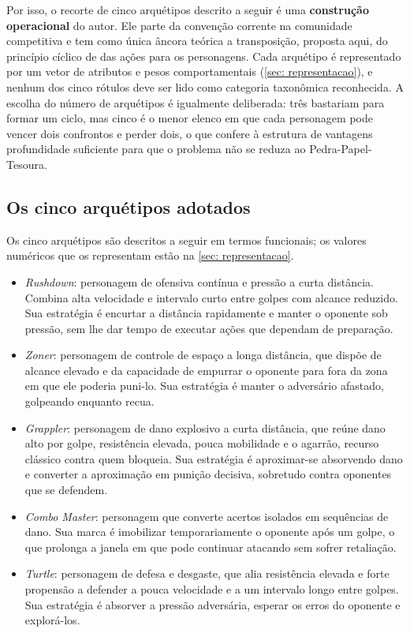 Por isso, o recorte de cinco arquétipos descrito a seguir é uma \textbf{construção operacional} do autor. Ele parte da convenção corrente na comunidade competitiva e tem como única âncora teórica a transposição, proposta aqui, do princípio cíclico de  das ações para os personagens. Cada arquétipo é representado por um vetor de atributos e pesos comportamentais (\autoref{sec: representacao}), e nenhum dos cinco rótulos deve ser lido como categoria taxonômica reconhecida. A escolha do número de arquétipos é igualmente deliberada: três bastariam para formar um ciclo, mas cinco é o menor elenco em que cada personagem pode vencer dois confrontos e perder dois, o que confere à estrutura de vantagens profundidade suficiente para que o problema não se reduza ao Pedra-Papel-Tesoura.

\subsection{Os cinco arquétipos adotados}

Os cinco arquétipos são descritos a seguir em termos funcionais; os valores numéricos que os representam estão na \autoref{sec: representacao}.

\begin{itemize}
    \item \textit{Rushdown}: personagem de ofensiva contínua e pressão a curta distância. Combina alta velocidade e intervalo curto entre golpes com alcance reduzido. Sua estratégia é encurtar a distância rapidamente e manter o oponente sob pressão, sem lhe dar tempo de executar ações que dependam de preparação.

    \item \textit{Zoner}: personagem de controle de espaço a longa distância, que dispõe de alcance elevado e da capacidade de empurrar o oponente para fora da zona em que ele poderia puni-lo. Sua estratégia é manter o adversário afastado, golpeando enquanto recua.

    \item \textit{Grappler}: personagem de dano explosivo a curta distância, que reúne dano alto por golpe, resistência elevada, pouca mobilidade e o agarrão, recurso clássico contra quem bloqueia. Sua estratégia é aproximar-se absorvendo dano e converter a aproximação em punição decisiva, sobretudo contra oponentes que se defendem.

    \item \textit{Combo Master}: personagem que converte acertos isolados em sequências de dano. Sua marca é imobilizar temporariamente o oponente após um golpe, o que prolonga a janela em que pode continuar atacando sem sofrer retaliação.

    \item \textit{Turtle}: personagem de defesa e desgaste, que alia resistência elevada e forte propensão a defender a pouca velocidade e a um intervalo longo entre golpes. Sua estratégia é absorver a pressão adversária, esperar os erros do oponente e explorá-los.
\end{itemize}

